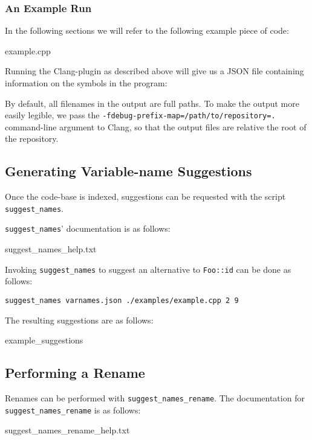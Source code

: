 \subsubsection{An Example Run}
In the following sections we will refer to the following example piece of \CC{}
code:


		{example.cpp}

Running the Clang-plugin as described above will give us a JSON file containing
information on the symbols in the program:



By default, all filenames in the output are full paths. To make the output more
easily legible, we pass the \lstinline|-fdebug-prefix-map=/path/to/repository=.|
command-line argument to Clang, so that the output files are relative the root
of the repository.

\subsection{Generating Variable-name Suggestions}
Once the code-base is indexed, suggestions can be requested with the script
\lstinline|suggest_names|.

\lstinline|suggest_names|' documentation is as follows:

	{suggest_names_help.txt}

Invoking \lstinline|suggest_names| to suggest an alternative to
\lstinline|Foo::id| can be done as follows:

\begin{lstlisting}
suggest_names varnames.json ./examples/example.cpp 2 9
\end{lstlisting}

The resulting suggestions are as follows:

		{example_suggestions}

\subsection{Performing a Rename}
Renames can be performed with \lstinline|suggest_names_rename|.
The documentation for \lstinline|suggest_names_rename| is as follows:

		{suggest_names_rename_help.txt}

